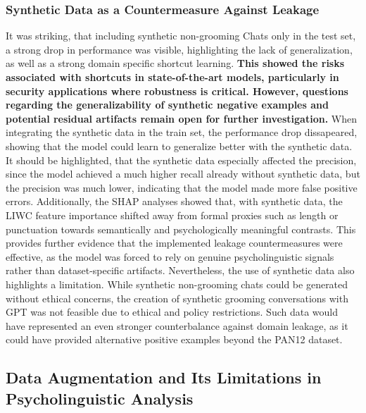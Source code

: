 \subsubsection{Synthetic Data as a Countermeasure Against Leakage}
It was striking, that including synthetic non-grooming Chats only in the test set, a strong drop in performance was visible, highlighting the lack of generalization, as well as a strong domain specific shortcut learning.  \textbf{This showed the risks associated with shortcuts in state-of-the-art models, particularly in security applications where robustness is critical. However, questions regarding the generalizability of synthetic negative examples and potential residual artifacts remain open for further investigation.} When integrating the synthetic data in the train set, the performance drop dissapeared, showing that the model could learn to generalize better with the synthetic data. It should be highlighted, that the synthetic data especially affected the precision, since the model achieved a much higher recall already without synthetic data, but the precision was much lower, indicating that the model made more false positive errors. Additionally, the SHAP analyses showed that, with synthetic data, the LIWC feature importance shifted away from formal proxies such as length or punctuation towards semantically and psychologically meaningful contrasts. This provides further evidence that the implemented leakage countermeasures were effective, as the model was forced to rely on genuine psycholinguistic signals rather than dataset-specific artifacts. Nevertheless, the use of synthetic data also highlights a limitation. While synthetic non-grooming chats could be generated without ethical concerns, the creation of synthetic grooming conversations with GPT was not feasible due to ethical and policy restrictions. Such data would have represented an even stronger counterbalance against domain leakage, as it could have provided alternative positive examples beyond the PAN12 dataset. 

\subsection{Data Augmentation and Its Limitations in Psycholinguistic Analysis}

